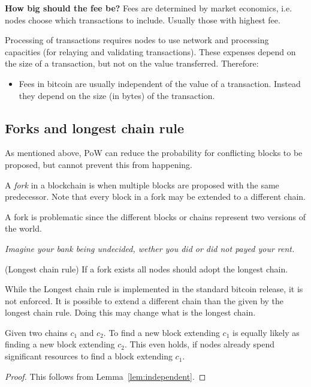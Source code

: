 
\begin{note} \textbf{How big should the fee be?}
Fees are determined by market economics, i.e. nodes choose which transactions to include. Usually those with highest fee.
	
Processing of transactions requires nodes to use network and processing capacities (for relaying and validating transactions). These expenses depend on the size of a transaction, but not on the value transferred. Therefore:
\begin{itemize}
	\item Fees in bitcoin are usually independent of the value of a transaction. Instead they depend on the size (in bytes) of the transaction.
\end{itemize}
\end{note}

\subsection{Forks and longest chain rule}
As mentioned above, PoW can reduce the probability for conflicting blocks to be proposed, but cannot prevent this from happening.

\begin{definition} A \emph{fork} in a blockchain is when multiple blocks are proposed with the same predecessor. Note that every block in a fork may be extended to a different chain.
\end{definition}

A fork is problematic since the different blocks or chains represent two versions of the world. 
	
\emph{Imagine your bank being undecided, wether you did or did not payed your rent.}

\begin{definition} (Longest chain rule) If a fork exists all nodes should adopt the longest chain.
\end{definition}

\begin{note} While the Longest chain rule is implemented in the standard bitcoin release, it is not enforced. It is possible to extend a different chain than the given by the longest chain rule. Doing this may change what is the longest chain. 
\end{note}

\begin{lem}
	Given two chains $c_1$ and $c_2$. To find a new block extending $c_1$ is equally likely as finding a new block extending $c_2$. This even holds, if nodes already spend significant resources to find a block extending $c_1$.
\end{lem}
\begin{proof} This follows from Lemma~\ref{lem:independent}.
\end{proof}


